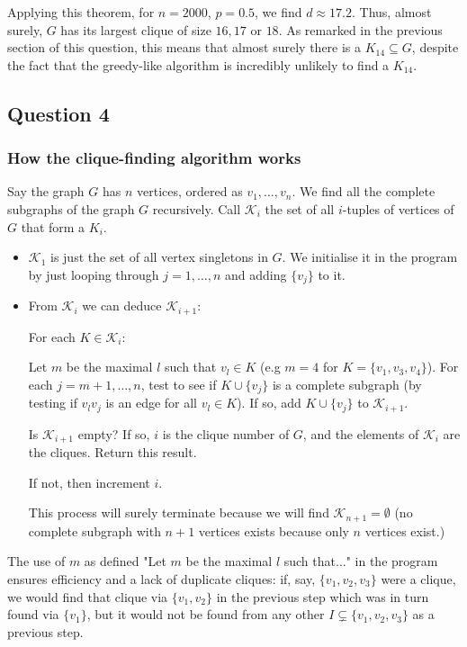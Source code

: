 \documentclass{article}
\begin{document}
Applying this theorem, for $n=2000$, $p=0.5$, we find $d \approx 17.2$. Thus, almost surely, $G$ has its largest clique of size $16, 17$ or $ 18$. As remarked in the previous section of this question, this means that almost surely there is a $K_{14} \subseteq G$, despite the fact that the greedy-like algorithm is incredibly unlikely to find a $K_{14}$.

\subsection{Question 4}

\subsubsection{How the clique-finding algorithm works}

Say the graph $G$ has $n$ vertices, ordered as $v_1, \dots, v_n$. We find all the complete subgraphs of the graph $G$ recursively. Call $\mathcal{K}_i$ the set of all $i$-tuples of vertices of $G$ that form a $K_i$.

\begin{itemize}
	\item $\mathcal{K}_1$ is just the set of all vertex singletons in $G$. We initialise it in the program by just looping through $j=1, \dots, n$ and adding $\{ v_j\}$ to it.
	
	\item From $\mathcal{K}_i$ we can deduce $\mathcal{K}_{i+1}$:
	
	\subitem For each $K \in \mathcal{K}_i$:
	
	\subsubitem Let $m$ be the maximal $l$ such that $v_l \in K$ (e.g $m=4$ for $K = \{v_1, v_3, v_4\}$). For each $j = m+1, \dots, n$, test to see if $K \cup \{ v_j\}$ is a complete subgraph (by testing if $v_l v_j$ is an edge for all $v_l \in K$). If so, add $K \cup \{ v_j\}$ to $\mathcal{K}_{i+1}$.
	
	\subitem Is $\mathcal{K}_{i+1}$ empty? If so, $i$ is the clique number of $G$, and the elements of $\mathcal{K}_{i}$ are the cliques. Return this result.
	
	\subitem If not, then increment $i$.
	
	\subsubitem This process will surely terminate because we will find $\mathcal{K}_{n+1} = \emptyset$ (no complete subgraph with $n+1$ vertices exists because only $n$ vertices exist.)
\end{itemize}

The use of $m$ as defined "Let $m$ be the maximal $l$ such that..." in the program ensures efficiency and a lack of duplicate cliques: if, say, $\{ v_1, v_2, v_3\}$ were a clique, we would find that clique via $\{ v_1, v_2\}$ in the previous step which was in turn found via $\{ v_1\}$, but it would not be found from any other $I \subsetneq \{ v_1, v_2, v_3\}$ as a previous step.
\end{document}
